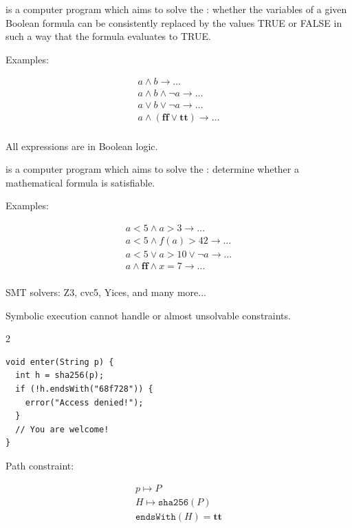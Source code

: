 \documentclass{article}
\begin{document}
\plush{}



 is a computer program which aims to solve the : whether the variables of a given Boolean formula can be consistently replaced by the values TRUE or FALSE in such a way that the formula evaluates to TRUE.

Examples:

\begin{equation*}
\begin{split}
a \wedge b \to \dots \\
a \wedge b \wedge \neg a \to \dots \\
a \vee b \vee \neg a \to \dots \\
a \wedge ( \textbf{ff} \vee \textbf{tt} ) \to \dots \\
\end{split}
\end{equation*}

All expressions are in Boolean logic.

\plush{}


 is a computer program which aims to solve the : determine whether a mathematical formula is satisfiable.

Examples:

\begin{equation*}
\begin{split}
a < 5 \wedge a > 3 \to \dots \\
a < 5 \wedge f(a) > 42 \to \dots \\
a < 5 \vee a > 10 \vee \neg a \to \dots \\
a \wedge \textbf{ff} \wedge x = 7 \to \dots \\
\end{split}
\end{equation*}

SMT solvers: Z3, cvc5, Yices, and many more...

\plush{}


Symbolic execution cannot handle  or almost unsolvable constraints.

\begin{multicols}{2}
{\small\begin{verbatim}
void enter(String p) {
  int h = sha256(p);
  if (!h.endsWith("68f728")) {
    error("Access denied!");
  }
  // You are welcome!
}
\end{verbatim}
}
\par\columnbreak\par
Path constraint:

\begin{gather*}
p \mapsto P \\
H \mapsto \texttt{sha256}(P) \\
\texttt{endsWith}(H) = \textbf{tt}
\end{gather*}
\end{multicols}
\end{document}
